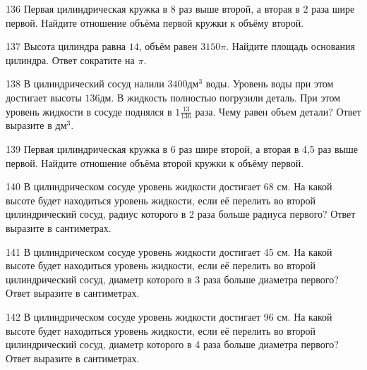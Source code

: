 \documentclass[4apaper]{article}
\begin{document}
\begin{taskBN}{136}
 Первая цилиндрическая кружка в 8 раз выше второй, а вторая в 2 раза шире первой. Найдите отношение объёма первой кружки к объёму второй.
\end{taskBN}

\begin{taskBN}{137}
Высота цилиндра равна $14$, объём равен $3150\pi$. Найдите площадь основания цилиндра. Ответ сократите на $\pi$.
\end{taskBN}

\begin{taskBN}{138}
В цилиндрический сосуд налили $3400\mbox{дм}^3$ воды. Уровень воды при этом достигает высоты $136$дм. В жидкость полностью погрузили деталь. При этом уровень жидкости в сосуде поднялся в ${1}\frac{13}{136}$ раза. Чему равен объем детали? Ответ выразите в $\mbox{дм}^3$.
\end{taskBN}

\begin{taskBN}{139}
 Первая цилиндрическая кружка в 6 раз шире второй, а вторая в 4,5 раз выше первой. Найдите отношение объёма второй кружки к объёму первой.
\end{taskBN}

\begin{taskBN}{140}
В цилиндрическом сосуде уровень жидкости достигает 68 см. На какой высоте будет находиться уровень жидкости, если её перелить во второй цилиндрический сосуд, радиус которого в 2 раза больше радиуса первого? Ответ выразите в сантиметрах.
\end{taskBN}

\begin{taskBN}{141}
В цилиндрическом сосуде уровень жидкости достигает 45 см. На какой высоте будет находиться уровень жидкости, если её перелить во второй цилиндрический сосуд, диаметр которого в 3 раза больше диаметра первого? Ответ выразите в сантиметрах.
\end{taskBN}

\begin{taskBN}{142}
В цилиндрическом сосуде уровень жидкости достигает 96 см. На какой высоте будет находиться уровень жидкости, если её перелить во второй цилиндрический сосуд, диаметр которого в 4 раза больше диаметра первого? Ответ выразите в сантиметрах.
\end{taskBN}
\end{document}

